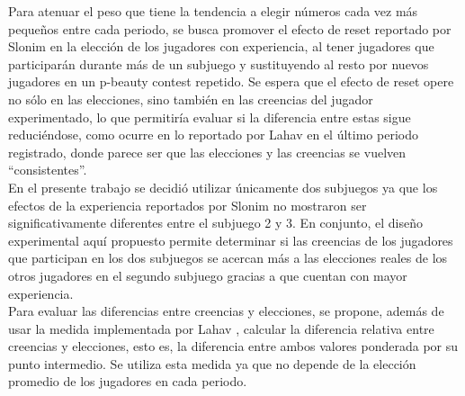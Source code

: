 Para atenuar el peso que tiene la tendencia a elegir números cada vez más pequeños entre cada periodo, se busca promover el efecto de reset reportado por Slonim \parencite*{Slonim2005} en la elección de los jugadores con experiencia, al tener jugadores que participarán durante más de un subjuego y sustituyendo al resto por nuevos jugadores en un p-beauty contest repetido. Se espera que el efecto de reset opere no sólo en las elecciones, sino también en las creencias del jugador experimentado, lo que permitiría evaluar si la diferencia entre estas sigue reduciéndose, como ocurre en lo reportado por Lahav \parencite*{Lahav2015} en el último periodo registrado, donde parece ser que las elecciones y las creencias se vuelven “consistentes”.\\

En el presente trabajo se decidió utilizar únicamente dos subjuegos ya que los efectos de la experiencia reportados por Slonim \parencite*{Slonim2005} no mostraron ser significativamente diferentes entre el subjuego 2 y 3. En conjunto, el diseño experimental aquí propuesto permite determinar si las creencias de los jugadores que participan en los dos subjuegos se acercan más a las elecciones reales de los otros jugadores en el segundo subjuego gracias a que cuentan con mayor experiencia.\\

Para evaluar las diferencias entre creencias y elecciones, se propone, además de usar la medida implementada por Lahav \parencite*{Lahav2015}, calcular la diferencia relativa entre creencias y elecciones, esto es, la diferencia entre ambos valores ponderada por su punto intermedio. Se utiliza esta medida ya que no depende de la elección promedio de los jugadores en cada periodo.\\
